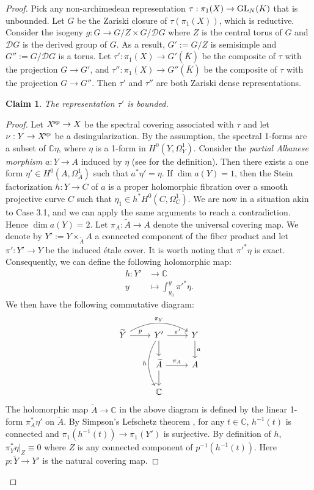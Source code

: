 \documentclass[english]{amsproc}
\theoremstyle{plain}
\newtheorem{claim}[thm]{Claim}
\theoremstyle{definition}
\theoremstyle{remark}
\theoremstyle{plain}
\numberwithin{equation}{thm} %
\newcommand{\cD}{\mathcal D}
\newcommand{\bC}{\mathbb{C}}
\newcommand{\xsp}{X^{\! \rm sp}}
\newcommand{\GL}{{\rm GL}}
\begin{document}
\begin{proof}
		
		Pick any non-archimedean representation $\tau:\pi_1(X)\to \GL_{N}(K)$ that is unbounded.  
		Let  $G$ be the Zariski closure of $\tau(\pi_1(X))$, which is reductive.  Consider the isogeny
		$g:G\to G/Z\times G/\cD G$ 
		where $Z$ is the central torus of $G$ and $\cD G$ is the derived group of $G$. 
		As a result, $G':=G/Z$  is semisimple and $G'':=G/\cD G$ is a torus. 
		Let
		$
		\tau':\pi_1(X)\to G'(\overline{K}) 
		$ 
		be the composite of $\tau$ with the projection $G\to G'$, and  
		$
		\tau'':\pi_1(X)\to   G''(\overline{K}) 
		$ 
		be the composite of $\tau$ with the projection $G\to G''$.  Then $\tau'$ and $\tau''$ are both Zariski dense representations. 
		\begin{claim}
			The representation $\tau'$ is bounded. 	 
		\end{claim}
		\begin{proof}
			Let $\xsp\to X$ be the spectral covering associated with $\tau$ and let $\nu:Y\to \xsp$ be a desingularization. By the assumption, the spectral 1-forms are a subset of $\bC \eta$, where $\eta$ is a  1-form in $  H^0(Y,\Omega_Y^1)$. Consider the \emph{partial Albanese morphism} $a:Y\to A$ induced by $\eta$ (see \cite[Definition 3.25]{CDY22} for the definition).   Then there exists a one form $\eta'\in H^0(A,\Omega_A^1)$ such that $a^*\eta'=\eta$.  If $\dim a(Y)=1$, then the Stein factorization $h:Y\to C$ of $a$ is a proper holomorphic fibration   over a smooth projective curve $C$ such that $\eta_1\in h^*H^0(C,\Omega_C^1)$.  We are now in  a situation akin to Case 3.1, and we can apply the same arguments to reach a contradiction.  Hence $\dim a(Y)=2$.   Let $\pi_A:\widetilde{A}\to A$ denote the universal covering map. We denote by $Y':=Y\times_{\widetilde{A}}A$  a connected component of the fiber product and let $\pi':Y'\to Y$ be the induced   \'etale cover.   
			It is worth noting that $\pi'^*\eta$ is  exact. Consequently, we can define the following holomorphic map: 
			\begin{align*}
				h: Y'&\to \bC\\
				y&\mapsto \int_{y_0}^{y}\pi'^*\eta.
			\end{align*} We then have the following commutative diagram:
			\begin{equation*}
				\begin{tikzcd}
					\widetilde{Y}\arrow[r, "p"]\arrow[rr, bend left=30, "\pi_Y"]&	Y'\arrow[dd, bend right=30, "h"']\arrow[r, "\pi'"] \arrow[d] & Y\arrow[d, "a"]\\
					&	\widetilde{A}\arrow[d] \arrow[r, "\pi_A"]& A\\
					&		\bC
				\end{tikzcd}
			\end{equation*} 
			The   holomorphic map $\widetilde{A}\to \bC$ in the above diagram is  defined by the linear 1-form $\pi_A^*\eta'$ on $\widetilde{A}$.   
			By Simpson's Lefschetz theorem \cite{Sim93}, for any $t\in \bC$, $h^{-1}(t)$ is connected and $\pi_1(h^{-1}(t))\to \pi_1(Y')$ is surjective.  
			By  
			definition of $h$,  $\pi_Y^*\eta|_{Z}\equiv 0$ where $Z$ is any connected component of $p^{-1}(h^{-1}(t))$. 
			Here $p:\widetilde{Y}\to Y'$ is the natural covering map. 
			

\end{proof}
\end{proof}
\end{document}
